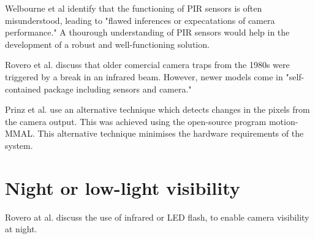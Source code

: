 \documentclass[class=report,11pt,crop=false]{standalone}
\begin{document}
Welbourne et al \cite{welbourne2016how} identify that the functioning of PIR sensors is often misunderstood, leading to "flawed inferences or expecatations of camera performance." A thourough understanding of PIR sensors would help in the development of a robust and well-functioning solution.


Rovero et al. \cite{rovero2013which} discuss that older comercial camera traps from the 1980s were triggered by a break in an infrared beam. However, newer models come in "self-contained package including sensors and camera." %

Prinz et al. \cite{prinz2016a} use an alternative technique which detects changes in the pixels from the camera output. This was achieved using the open-source program motion-MMAL. This alternative technique minimises the hardware requirements of the system.

\section{Night or low-light visibility}

Rovero at al. \cite{rovero2013which} discuss the use of infrared or LED flash, to enable camera visibility at night. 


\ifstandalone

\printnoidxglossary[type=\acronymtype,nonumberlist]
\fi
\end{document}
